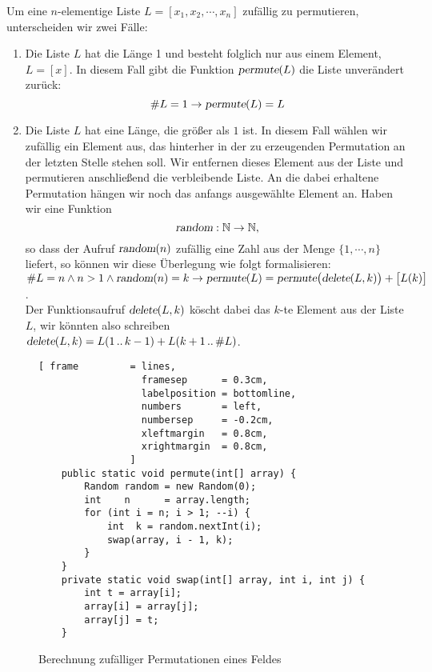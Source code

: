 Um eine $n$-elementige Liste $L = [x_1,x_2, \cdots, x_n]$ zuf\"allig zu permutieren,
unterscheiden wir zwei F\"alle:
\begin{enumerate}
\item Die Liste $L$ hat die L\"ange 1 und besteht folglich nur aus einem Element, $L = [x]$.
      In diesem Fall gibt die Funktion $\textsl{permute}(L)$ die Liste unver\"andert zur\"uck:
      \[ \#L = 1 \rightarrow \textsl{permute}(L) = L \]
\item Die Liste $L$ hat eine L\"ange, die gr\"o{\ss}er als $1$ ist.  In diesem Fall w\"ahlen wir
      zuf\"allig ein Element aus, das hinterher  in der zu erzeugenden Permutation an der letzten Stelle
      stehen soll.  Wir entfernen dieses Element aus der Liste und permutieren
      anschlie{\ss}end die verbleibende Liste.  An die dabei erhaltene Permutation h\"angen wir
      noch das anfangs ausgew\"ahlte Element an.  Haben wir eine Funktion
      \[ \textsl{random}: \mathbb{N} \rightarrow \mathbb{N}, \]
      so dass der Aufruf $\textsl{random}(n)$ zuf\"allig eine Zahl aus der Menge $\{1,\cdots,n\}$
      liefert, so k\"onnen wir diese Überlegung wie folgt formalisieren:
      \\[0.2cm]
      \hspace*{1.3cm}
      $ \#L = n \wedge n > 1 \wedge \textsl{random}(n) = k \rightarrow 
         \textsl{permute}(L) = \textsl{permute}\bigl(\textsl{delete}(L,k)\bigr) + \bigl[ L(k)
         \bigr]
      $.
\\[0.2cm]
      Der  Funktionsaufruf $\textsl{delete}(L,k)$ k\"oscht dabei das $k$-te Element aus der Liste $L$,
      wir k\"onnten also schreiben
      \\[0.2cm]
      \hspace*{1.3cm}
      $\textsl{delete}(L,k) = L(1\,..\,k-1) + L(k+1\,..\,\#L)$.
\end{enumerate}

\begin{figure}[!ht]
\centering
\begin{Verbatim}[ frame         = lines, 
                  framesep      = 0.3cm, 
                  labelposition = bottomline,
                  numbers       = left,
                  numbersep     = -0.2cm,
                  xleftmargin   = 0.8cm,
                  xrightmargin  = 0.8cm,
                ]
    public static void permute(int[] array) {
        Random random = new Random(0);
        int    n      = array.length;
        for (int i = n; i > 1; --i) {
            int  k = random.nextInt(i);
            swap(array, i - 1, k);
        }
    }
    private static void swap(int[] array, int i, int j) {
        int t = array[i];
        array[i] = array[j];
        array[j] = t;
    }
\end{Verbatim}
\vspace*{-0.3cm}
\caption{Berechnung zuf\"alliger Permutationen eines Feldes}
\label{fig:RandomPermutation.java}
\end{figure}


